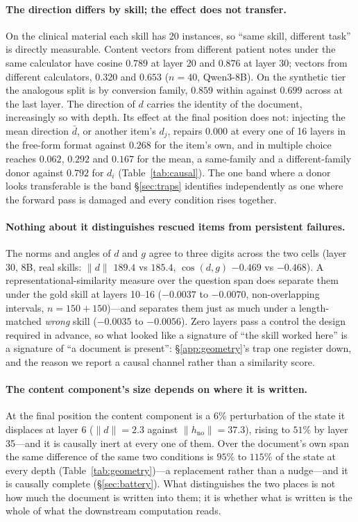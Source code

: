\documentclass{article}
\newcommand{\dvec}{\ensuremath{d}}
\newcommand{\gvec}{\ensuremath{g}}
\begin{document}
\paragraph{The direction differs by skill; the effect does not transfer.}
On the clinical material each skill has 20 instances, so ``same skill, different
task'' is directly measurable. Content vectors from different patient notes under
the same calculator have cosine $0.789$ at layer 20 and $0.876$ at layer 30;
vectors from different calculators, $0.320$ and $0.653$ ($n=40$, Qwen3-8B). On
the synthetic tier the analogous split is by conversion family, $0.859$ within
against $0.699$ across at the last layer. The direction of $\dvec$ carries the
identity of the document, increasingly so with depth. Its effect at the final
position does not: injecting the mean direction $\bar{\dvec}$, or another item's
$\dvec_j$, repairs $0.000$ at every one of 16 layers in the free-form format
against $0.268$ for the item's own, and in multiple choice reaches $0.062$,
$0.292$ and $0.167$ for the mean, a same-family and a different-family donor
against $0.792$ for $\dvec_i$ (Table~\ref{tab:causal}). The one band where a
donor looks transferable is the band \S\ref{sec:traps} identifies independently
as one where the forward pass is damaged and every condition rises together.

\paragraph{Nothing about it distinguishes rescued items from persistent
failures.} The norms and angles of $\dvec$ and $\gvec$ agree to three digits
across the two cells (layer 30, 8B, real skills: $\|\dvec\|$ $189.4$ vs $185.4$,
$\cos(\dvec,\gvec)$ $-0.469$ vs $-0.468$). A representational-similarity measure
over the question span does separate them under the gold skill at layers 10--16
($-0.0037$ to $-0.0070$, non-overlapping intervals, $n=150+150$)---and separates
them just as much under a length-matched \emph{wrong} skill ($-0.0035$ to
$-0.0056$). Zero layers pass a control the design required in advance, so what
looked like a signature of ``the skill worked here'' is a signature of ``a
document is present'': \S\ref{app:geometry}'s trap one register down, and the
reason we report a causal channel rather than a similarity score.

\paragraph{The content component's size depends on where it is written.} At the
final position the content component is a $6\%$ perturbation of the state it
displaces at layer 6 ($\|\dvec\|=2.3$ against $\|h_{\text{no}}\|=37.3$), rising
to $51\%$ by layer 35---and it is causally inert at every one of them. Over the
document's own span the same difference of the same two conditions is $95\%$ to
$115\%$ of the state at every depth (Table~\ref{tab:geometry})---a replacement
rather than a nudge---and it is causally complete (\S\ref{sec:battery}). What
distinguishes the two places is not how much the document is written into them;
it is whether what is written is the whole of what the downstream computation
reads.
\end{document}
